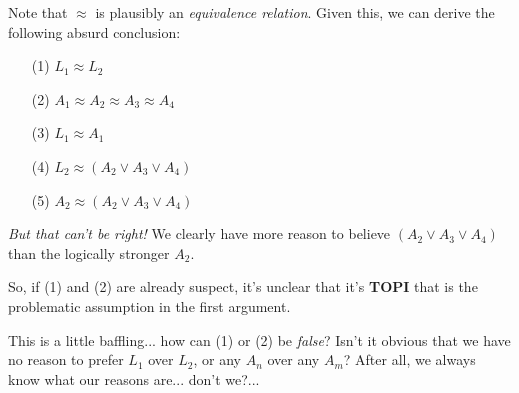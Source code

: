\documentclass{tufte-handout}
\begin{document}
 \vspace{2mm}

\noindent Note that $\approx$ is plausibly an \textit{equivalence relation}. Given this, we can derive the following absurd conclusion:

    \begin{enumerate}
    \item[(1)] $L_1\approx L_2$
    \item[(2)] $A_1\approx A_2\approx A_3\approx A_4$
    \item[(3)] $L_1\approx A_1$
    \item[(4)] $L_2\approx(A_2 \vee A_3 \vee A_4 )$
    \item[(5)] $A_2\approx(A_2 \vee A_3 \vee A_4)$
    \end{enumerate}

\noindent \textit{But that can't be right!}  We clearly have more reason to believe $(A_2 \vee A_3 \vee A_4)$ than the logically stronger $A_2$.

\vspace{2mm}

\noindent So, if (1) and (2) are already suspect, it's unclear that it's \textbf{TOPI} that is the problematic assumption in the first argument. 

\vspace{2mm}

\noindent This is a little baffling... how can (1) or (2) be \textit{false}? Isn't it obvious that we have no reason to prefer $L_1$ over $L_2$, or any $A_n$ over any $A_m$? After all, we always know what our reasons are... don't we?...


\end{document}
